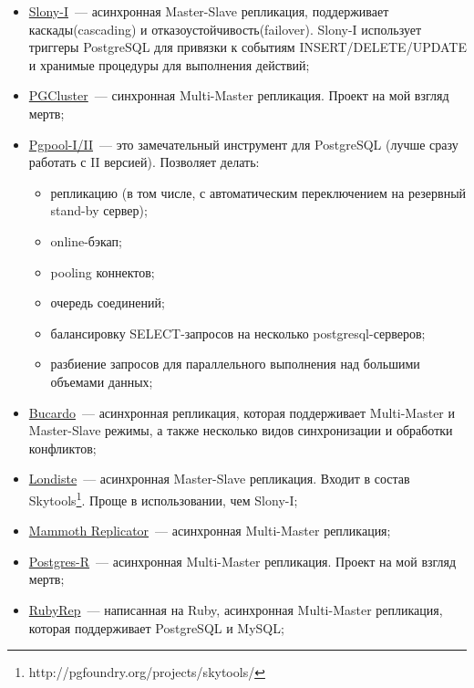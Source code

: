 \begin{itemize}
  \item \href{http://www.slony.info/}{Slony-I}~--- асинхронная Master-Slave репликация, поддерживает каскады(cascading) и отказоустойчивость(failover). Slony-I использует триггеры PostgreSQL для привязки к событиям INSERT/DELETE/UPDATE и хранимые процедуры для выполнения действий;

  \item \href{http://pgfoundry.org/projects/pgcluster/}{PGCluster}~--- синхронная Multi-Master репликация. Проект на мой взгляд мертв;

  \item \href{http://pgpool.projects.postgresql.org/}{Pgpool-I/II}~--- это замечательный инструмент для PostgreSQL (лучше сразу работать с II версией). Позволяет делать:
  \begin{itemize}
    \item репликацию (в том числе, с автоматическим переключением на резервный stand-by сервер);
    \item online-бэкап;
    \item pooling коннектов;
    \item очередь соединений;
    \item балансировку SELECT-запросов на несколько postgresql-серверов;
    \item разбиение запросов для параллельного выполнения над большими объемами данных;
  \end{itemize}

  \item \href{http://bucardo.org/}{Bucardo}~--- асинхронная репликация, которая поддерживает Multi-Master и Master-Slave режимы, а также несколько видов синхронизации и обработки конфликтов;

  \item \href{http://skytools.projects.postgresql.org/doc/londiste.ref.html}{Londiste}~--- асинхронная Master-Slave репликация. Входит в состав Skytools\footnote{http://pgfoundry.org/projects/skytools/}. Проще в использовании, чем Slony-I;

  \item \href{http://www.commandprompt.com/products/mammothreplicator/}{Mammoth Replicator}~--- асинхронная Multi-Master репликация;

  \item \href{http://www.postgres-r.org/}{Postgres-R}~--- асинхронная Multi-Master репликация. Проект на мой взгляд мертв;

  \item \href{http://www.rubyrep.org/}{RubyRep}~--- написанная на Ruby, асинхронная Multi-Master репликация, которая поддерживает PostgreSQL и MySQL;
\end{itemize}

